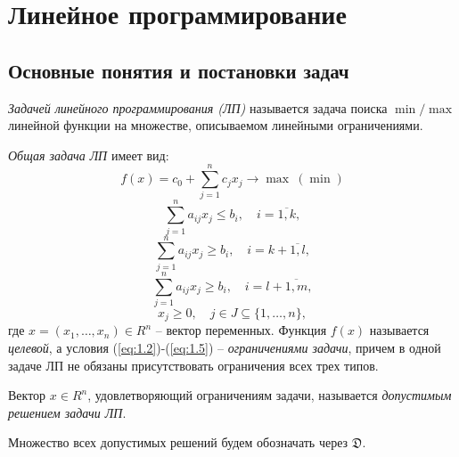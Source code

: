 \section{Линейное программирование}

\subsection{Основные понятия и постановки задач}

\begin{definition}
    \emph{Задачей линейного программирования (ЛП)} называется задача поиска $\min/\max$ линейной функции на множестве, описываемом линейными ограничениями. 
        
    \emph{Общая задача ЛП} имеет вид:
        \begin{equation}\label{eq:1.1}
            f(x)=c_{0}+\sum_{j=1}^{n}c_jx_j \rightarrow \max \ (\min)
        \end{equation}
        \begin{equation}\label{eq:1.2}
            \sum_{j=1}^{n}a_{ij}x_{j} \leqslant b_{i}, \quad i = \overline{1,k},
        \end{equation}
        \begin{equation}\label{eq:1.3}
            \sum_{j=1}^{n}a_{ij}x_{j} \geqslant b_{i}, \quad i = k + \overline{1,l},
        \end{equation}
        \begin{equation}\label{eq:1.4}
            \sum_{j=1}^{n}a_{ij}x_{j} \geqslant b_{i}, \quad i = l + \overline{1,m},
        \end{equation}
        \begin{equation}\label{eq:1.5}
            x_{j} \geqslant 0, \quad j \in J \subseteq \{1,\ldots,n\},
        \end{equation}
    где $x = (x_1,\ldots,x_n)\in R^n$ -- вектор переменных. Функция $f(x)$ называется \emph{целевой}, а условия (\ref{eq:1.2})-(\ref{eq:1.5}) -- \emph{ограничениями задачи}, причем в одной задаче ЛП не обязаны присутствовать ограничения всех трех типов.
\end{definition}

\begin{definition}
    Вектор $x \in R^{n}$, удовлетворяющий ограничениям задачи, называется \emph{допустимым решением задачи ЛП}.

    Множество всех допустимых решений будем обозначать через $\mathfrak{D}$.
\end{definition}

